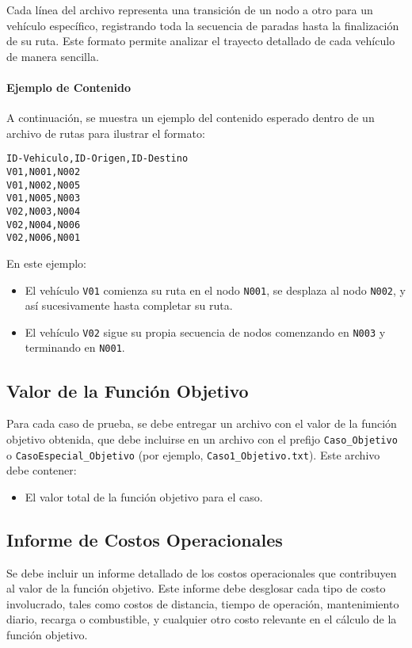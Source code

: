\documentclass[12pt]{article}
\begin{document}
Cada línea del archivo representa una transición de un nodo a otro para un vehículo específico, registrando toda la secuencia de paradas hasta la finalización de su ruta. Este formato permite analizar el trayecto detallado de cada vehículo de manera sencilla.

\paragraph{Ejemplo de Contenido}
A continuación, se muestra un ejemplo del contenido esperado dentro de un archivo de rutas para ilustrar el formato:
\begin{verbatim}
ID-Vehiculo,ID-Origen,ID-Destino
V01,N001,N002
V01,N002,N005
V01,N005,N003
V02,N003,N004
V02,N004,N006
V02,N006,N001
\end{verbatim}

En este ejemplo:
\begin{itemize}
    \item El vehículo \texttt{V01} comienza su ruta en el nodo \texttt{N001}, se desplaza al nodo \texttt{N002}, y así sucesivamente hasta completar su ruta.
    \item El vehículo \texttt{V02} sigue su propia secuencia de nodos comenzando en \texttt{N003} y terminando en \texttt{N001}.
\end{itemize}

\subsection{Valor de la Función Objetivo}
Para cada caso de prueba, se debe entregar un archivo con el valor de la función objetivo obtenida, que debe incluirse en un archivo con el prefijo \texttt{Caso\_Objetivo} o \texttt{CasoEspecial\_Objetivo} (por ejemplo, \texttt{Caso1\_Objetivo.txt}). Este archivo debe contener:
\begin{itemize}
    \item El valor total de la función objetivo para el caso.
\end{itemize}

\subsection{Informe de Costos Operacionales}
Se debe incluir un informe detallado de los costos operacionales que contribuyen al valor de la función objetivo. Este informe debe desglosar cada tipo de costo involucrado, tales como costos de distancia, tiempo de operación, mantenimiento diario, recarga o combustible, y cualquier otro costo relevante en el cálculo de la función objetivo.
\end{document}
